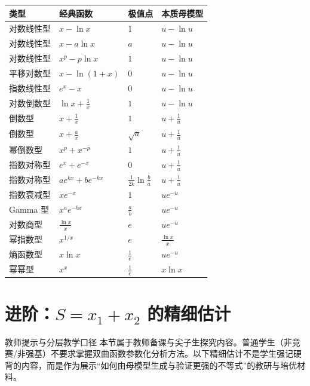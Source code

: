 \documentclass[11pt,a4paper]{ctexart}
\begin{document}
\begin{center}
\renewcommand{\arraystretch}{1.4}
\setlength{\tabcolsep}{22pt}
\begin{longtable}{llll}
\toprule
\textbf{类型} & \textbf{经典函数} & \textbf{极值点} & \textbf{本质母模型} \\
\midrule
对数线性型 & $x-\ln x$ & $1$ & $u-\ln u$ \\
对数线性型 & $x-a\ln x$ & $a$ & $u-\ln u$ \\
对数线性型 & $x^p-p\ln x$ & $1$ & $u-\ln u$ \\
平移对数型 & $x-\ln(1+x)$ & $0$ & $u-\ln u$ \\
指数线性型 & $e^x-x$ & $0$ & $u-\ln u$ \\
对数倒数型 & $\ln x+\frac{1}{x}$ & $1$ & $u-\ln u$ \\
倒数型 & $x+\frac{1}{x}$ & $1$ & $u+\frac{1}{u}$ \\
倒数型 & $x+\frac{a}{x}$ & $\sqrt{a}$ & $u+\frac{1}{u}$ \\
幂倒数型 & $x^p+x^{-p}$ & $1$ & $u+\frac{1}{u}$ \\
指数对称型 & $e^x+e^{-x}$ & $0$ & $u+\frac{1}{u}$ \\
指数对称型 & $ae^{kx}+be^{-kx}$ & $\frac{1}{2k}\ln\frac{b}{a}$ & $u+\frac{1}{u}$ \\
指数衰减型 & $xe^{-x}$ & $1$ & $ue^{-u}$ \\
Gamma 型 & $x^ae^{-bx}$ & $\frac{a}{b}$ & $ue^{-u}$ \\
对数商型 & $\frac{\ln x}{x}$ & $e$ & $ue^{-u}$ \\
幂指数型 & $x^{1/x}$ & $e$ & $\frac{\ln x}{x}$ \\
熵函数型 & $x\ln x$ & $\frac{1}{e}$ & $ue^{-u}$ \\
幂幂型 & $x^x$ & $\frac{1}{e}$ & $x\ln x$ \\
\bottomrule
\end{longtable}
\end{center}

\section{进阶：$S=x_1+x_2$ 的精细估计}

\begin{keybox}{教师提示与分层教学口径}
本节属于教师备课与尖子生探究内容。普通学生（非竞赛/非强基）不要求掌握双曲函数参数化分析方法。以下精细估计不是学生强记硬背的内容，而是作为展示“如何由母模型生成与验证更强的不等式”的教研与培优材料。
\end{keybox}
\end{document}

